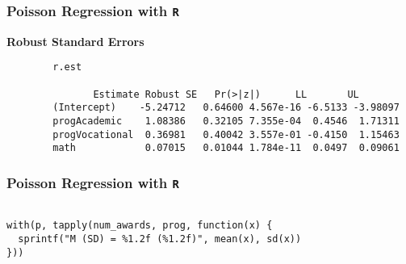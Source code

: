 \documentclass[00-GLMregslides.tex]{subfiles}
\begin{document}
	\begin{frame}[fragile]
		
		\frametitle{Poisson Regression with \texttt{R}}
		\large 
		\textbf{Robust Standard Errors}
		\begin{verbatim}
		r.est
		
		       Estimate Robust SE   Pr(>|z|)      LL       UL
		(Intercept)    -5.24712   0.64600 4.567e-16 -6.5133 -3.98097
		progAcademic    1.08386   0.32105 7.355e-04  0.4546  1.71311
		progVocational  0.36981   0.40042 3.557e-01 -0.4150  1.15463
		math            0.07015   0.01044 1.784e-11  0.0497  0.09061
		\end{verbatim}
		
		
	\end{frame}
	
	
\begin{frame}[fragile]
\frametitle{Poisson Regression with \texttt{R} }
\begin{framed}
\begin{verbatim}

with(p, tapply(num_awards, prog, function(x) {
  sprintf("M (SD) = %1.2f (%1.2f)", mean(x), sd(x))
}))
 



\end{verbatim}
\end{framed}
\end{frame}
\end{document}
